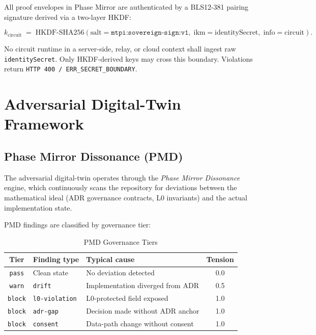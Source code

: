 \documentclass[12pt,a4paper]{article}
\theoremstyle{definition}
\theoremstyle{plain}
\theoremstyle{remark}
\begin{document}
All proof envelopes in Phase Mirror are authenticated by a BLS12-381 pairing
signature derived via a two-layer HKDF:

\begin{equation}
  k_{\text{circuit}} \;=\;
  \mathrm{HKDF\text{-}SHA256}\!\left(
    \text{salt} = \texttt{mtpi:sovereign-sign:v1},\;
    \text{ikm} = \text{identitySecret},\;
    \text{info} = \text{circuit}
  \right).
\end{equation}

\begin{alertbox}[title={L0 Key Boundary Invariant}]
No circuit runtime in a server-side, relay, or cloud context shall ingest raw
\texttt{identitySecret}. Only HKDF-derived keys may cross this boundary.
Violations return \texttt{HTTP 400 / ERR\_SECRET\_BOUNDARY}.
\end{alertbox}

\newpage

\section{Adversarial Digital-Twin Framework}
\label{sec:adt}

\subsection{Phase Mirror Dissonance (PMD)}

The adversarial digital-twin operates through the \emph{Phase Mirror Dissonance}
engine, which continuously scans the repository for deviations between the
mathematical ideal (ADR governance contracts, L0 invariants) and the actual
implementation state.

PMD findings are classified by governance tier:

\begin{table}[h!]
\centering
\caption{PMD Governance Tiers}
\begin{tabular}{cllc}
\toprule
\textbf{Tier} & \textbf{Finding type} & \textbf{Typical cause} & \textbf{Tension} \\
\midrule
\texttt{pass}  & Clean state          & No deviation detected           & 0.0 \\
\texttt{warn}  & \texttt{drift}       & Implementation diverged from ADR & 0.5 \\
\texttt{block} & \texttt{l0-violation}& L0-protected field exposed       & 1.0 \\
\texttt{block} & \texttt{adr-gap}     & Decision made without ADR anchor & 1.0 \\
\texttt{block} & \texttt{consent}     & Data-path change without consent & 1.0 \\
\bottomrule
\end{tabular}
\end{table}
\end{document}
